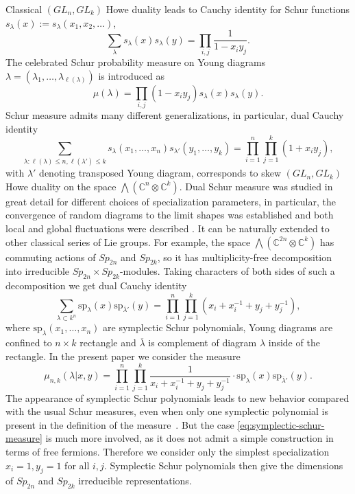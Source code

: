 \documentclass[reqno,11pt]{amsart}
\newcommand{\Sp}{Sp}
\newcommand{\GL}{GL}
\newcommand{\CC}{\mathbb{C}}
\newcommand{\sps}{\mathrm{sp}}
\theoremstyle{plain}
\theoremstyle{definition}
\numberwithin{equation}{section}
\begin{document}
Classical $(\GL_{n},\GL_{k})$ Howe duality \cite{R_Howe, howe1995perspectives} leads to Cauchy identity for Schur functions $s_{\lambda}(x):=s_{\lambda}(x_{1},x_{2},\dots)$,
$$\sum_{\lambda}s_{\lambda}(x)s_{\lambda}(y)=\prod_{i,j}\frac{1}{1-x_{i}y_{j}}.
$$
The celebrated Schur probability measure on Young diagrams 
$\lambda=(\lambda_{1},\dots,\lambda_{\ell(\lambda)})$ is introduced as~\cite{Okounkov01}
$$
\mu(\lambda)=\prod_{i,j}(1-x_{i}y_{j})s_{\lambda}(x)s_{\lambda}(y).
$$
 Schur measure admits many different generalizations, in particular, dual Cauchy identity
$$\sum_{\lambda:\ell(\lambda)\leq n,\ell(\lambda')\leq
  k}s_{\lambda}(x_{1},\dots,x_{n})
s_{\lambda'}(y_{1},\dots,y_{k})=\prod_{i=1}^{n}\prod_{j=1}^{k}(1+x_{i}y_{j}),$$
with $\lambda'$ denoting transposed Young diagram, corresponds to skew $(\GL_{n},\GL_{k})$ Howe duality on the space
$\bigwedge(\CC^{n}\otimes\CC^{k})$. Dual Schur measure was studied in great detail for different choices of specialization parameters, in particular, the convergence of random diagrams to the limit shapes was established and both local and global fluctuations were described
\cite{GTW01,GTW02II,GTW02,betea2024}. It can be naturally extended to other classical series of Lie groups. For example, the space
$\bigwedge(\CC^{2n}\otimes \CC^{k})$ has commuting actions of $\Sp_{2n}$ and $\Sp_{2k}$, so it has multiplicity-free decomposition into irreducible $\Sp_{2n}\times\Sp_{2k}$-modules. Taking characters of both sides of such a decomposition we get dual Cauchy identity
$$\sum_{\lambda\subset
  k^{n}}\sps_{\lambda}(x)\sps_{\overline{\lambda}'}(y)=\prod_{i=1}^{n}\prod_{j=1}^{k}(x_{i}+x_{i}^{-1}+y_{j}+y_{j}^{-1}),$$
where $\sps_{\lambda}(x_{1},\dots,x_{n})$ are symplectic Schur
polynomials, Young diagrams are confined to $n\times k$ rectangle and
$\overline{\lambda}$ is complement of diagram $\lambda$ inside of the
rectangle. In the present paper we consider the measure
\begin{equation}
  \label{eq:symplectic-schur-measure}
  \mu_{n,k}(\lambda|x,y)=\prod_{i=1}^{n}\prod_{j=1}^{k}\frac{1}{x_{i}+x_{i}^{-1}+y_{j}+y_{j}^{-1}}
  \cdot\sps_{\lambda}(x)\sps_{\overline{\lambda}'}(y).
\end{equation}
The appearance of symplectic Schur polynomials leads to new behavior compared with the usual Schur measures, even when only one symplectic polynomial is present in the definition of the
measure~\cite{Betea18,cuenca2024symplecticschurprocess}. But the case
\eqref{eq:symplectic-schur-measure} is much more involved, as it does not admit a simple construction in terms of free fermions. Therefore we consider only the simplest specialization $x_{i}=1, y_{j}=1$ for
all $i,j$. Symplectic Schur polynomials then give the dimensions of $\Sp_{2n}$ and $\Sp_{2k}$ irreducible representations.
\end{document}
